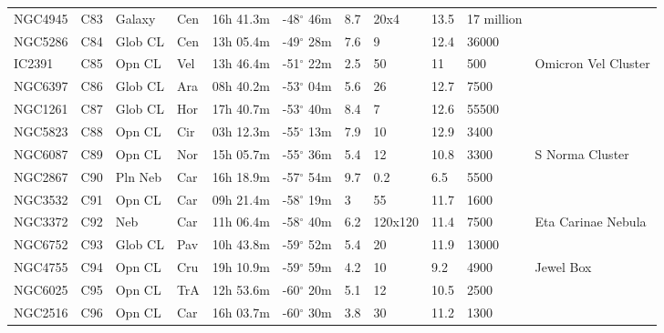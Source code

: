 \begin{longtable}{@{}lllllllllll@{}}
NGC4945    & C83           & Galaxy  & Cen & 16h 41.3m & -48$^{\circ}$ 46m & 8.7  & 20x4           & 13.5 & 17 million    &                                 \\
NGC5286    & C84           & Glob CL & Cen & 13h 05.4m & -49$^{\circ}$ 28m & 7.6  & 9              & 12.4 & 36000         &                                 \\
IC2391     & C85           & Opn CL  & Vel & 13h 46.4m & -51$^{\circ}$ 22m & 2.5  & 50             & 11   & 500           & Omicron Vel Cluster             \\
NGC6397    & C86           & Glob CL & Ara & 08h 40.2m & -53$^{\circ}$ 04m & 5.6  & 26             & 12.7 & 7500          &                                 \\
NGC1261    & C87           & Glob CL & Hor & 17h 40.7m & -53$^{\circ}$ 40m & 8.4  & 7              & 12.6 & 55500         &                                 \\
NGC5823    & C88           & Opn CL  & Cir & 03h 12.3m & -55$^{\circ}$ 13m & 7.9  & 10             & 12.9 & 3400          &                                 \\
NGC6087    & C89           & Opn CL  & Nor & 15h 05.7m & -55$^{\circ}$ 36m & 5.4  & 12             & 10.8 & 3300          & S Norma Cluster                 \\
NGC2867    & C90           & Pln Neb & Car & 16h 18.9m & -57$^{\circ}$ 54m & 9.7  & 0.2            & 6.5  & 5500          &                                 \\
NGC3532    & C91           & Opn CL  & Car & 09h 21.4m & -58$^{\circ}$ 19m & 3    & 55             & 11.7 & 1600          &                                 \\
NGC3372    & C92           & Neb     & Car & 11h 06.4m & -58$^{\circ}$ 40m & 6.2  & 120x120        & 11.4 & 7500          & Eta Carinae Nebula              \\
NGC6752    & C93           & Glob CL & Pav & 10h 43.8m & -59$^{\circ}$ 52m & 5.4  & 20             & 11.9 & 13000         &                                 \\
NGC4755    & C94           & Opn CL  & Cru & 19h 10.9m & -59$^{\circ}$ 59m & 4.2  & 10             & 9.2  & 4900          & Jewel Box                       \\
NGC6025    & C95           & Opn CL  & TrA & 12h 53.6m & -60$^{\circ}$ 20m & 5.1  & 12             & 10.5 & 2500          &                                 \\
NGC2516    & C96           & Opn CL  & Car & 16h 03.7m & -60$^{\circ}$ 30m & 3.8  & 30             & 11.2 & 1300          &                                 \\

\end{longtable}
